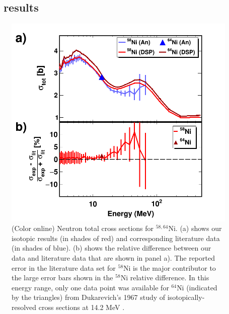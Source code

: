 \subsection{\niEightFour\ \tot\ results}
\begin{figure}
    \includegraphics[scale=0.35]{figures/TwoPanelNi.png}
    \caption{(Color online) Neutron total cross sections for $^{58,64}$Ni.
        (a) shows our isotopic results (in shades of red) and
        corresponding literature data \cite{Perey1993, Dukarevich1967} (in
        shades of blue). (b) shows the relative difference between our data
        and literature data that are shown in panel a). The reported error in
        the literature data set for $^{58}$Ni is the major contributor to the
        large error bars shown in the $^{58}$Ni relative difference. In this
        energy range, only one data point was available for $^{64}$Ni (indicated
        by the triangles) from Dukarevich's 1967 study of isotopically-resolved cross
        sections at 14.2 MeV \cite{Dukarevich1967}.
    }
    \label{TwoPanelNi}
\end{figure}

